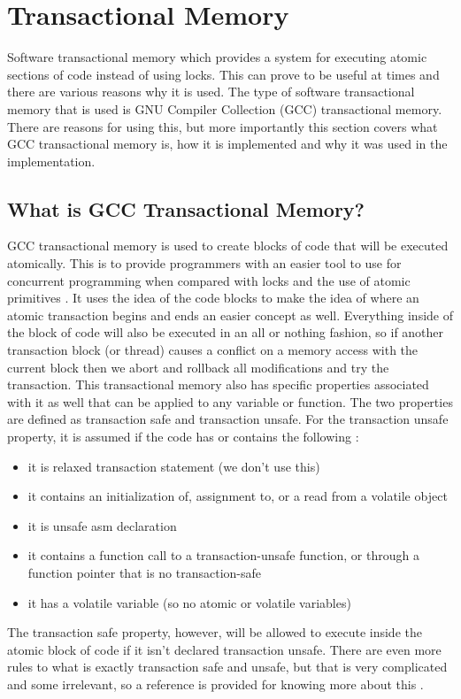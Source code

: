 \documentclass[conference]{IEEEtran}
\begin{document}
\section{Transactional Memory}
Software transactional memory which provides a system for executing atomic sections of code instead of using locks. This can prove to be useful at times and there are various reasons why it is used. The type of software transactional memory that is used is GNU Compiler Collection (GCC) transactional memory. There are reasons for using this, but more importantly this section covers what GCC transactional memory is, how it is implemented and why it was used in the implementation.
\subsection{What is GCC Transactional Memory?}
GCC transactional memory is used to create blocks of code that will be executed atomically. This is to provide programmers with an easier tool to use for concurrent programming when compared with locks and the use of atomic primitives \cite{b4}. It uses the idea of the code blocks to make the idea of where an atomic transaction begins and ends an easier concept as well. Everything inside of the block of code will also be executed in an all or nothing fashion, so if another transaction block (or thread) causes a conflict on a memory access with the current block then we abort and rollback all modifications and try the transaction. This transactional memory also has specific properties associated with it as well that can be applied to any variable or function. The two properties are defined as transaction safe and transaction unsafe. For the transaction unsafe property, it is assumed if the code has or contains the following \cite{b4}:
\begin{itemize}
\item it is relaxed transaction statement (we don't use this)
\item it contains an initialization of, assignment to, or a read from a volatile object
\item it is unsafe asm declaration
\item it contains a function call to a transaction-unsafe function, or through a function pointer that is no transaction-safe
\item it has a volatile variable (so no atomic or volatile variables)
\end{itemize}
The transaction safe property, however, will be allowed to execute inside the atomic block of code if it isn't declared transaction unsafe. There are even more rules to what is exactly transaction safe and unsafe, but that is very complicated and some irrelevant, so a reference is provided for knowing more about this \cite{b4}.
\end{document}
